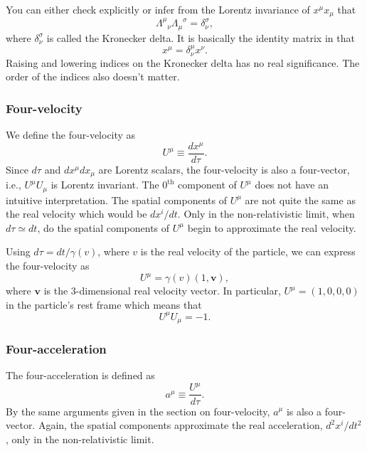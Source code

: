 \documentclass{article}
\begin{document}
You can either check explicitly or infer from the Lorentz invariance of $x^\mu x_\mu$ that \begin{equation} \Lambda^\mu_{\,\,\,\, \nu} \Lambda_\mu^{\,\,\,\, \sigma} = \delta^\sigma_\nu , \end{equation} where $\delta^\sigma_\nu$ is called the Kronecker delta. It is basically the identity matrix in that \begin{equation} x^\mu = \delta^\mu_\nu x^\nu . \end{equation} Raising and lowering indices on the Kronecker delta has no real significance. The order of the indices also doesn't matter.

\subsubsection*{Four-velocity}

We define the four-velocity as \begin{equation} U^\mu \equiv \frac{dx^\mu}{d \tau} . \end{equation} Since $d \tau$ and $dx^\mu dx_\mu$ are Lorentz scalars, the four-velocity is also a four-vector, i.e., $U^\mu U_\mu$ is Lorentz invariant. The $0^\mathrm{th}$ component of $U^\mu$ does not have an intuitive interpretation. The spatial components of $U^\mu$ are not quite the same as the real velocity which would be $dx^i/dt$. Only in the non-relativistic limit, when $d \tau \simeq dt$, do the spatial components of $U^\mu$ begin to approximate the real velocity.

Using $d \tau = dt / \gamma(v)$, where $v$ is the real velocity of the particle, we can express the four-velocity as \begin{equation} U^\mu = \gamma(v) (1,\mathbf{v}) , \end{equation} where $\mathbf{v}$ is the 3-dimensional real velocity vector. In particular, $U^\mu = (1,0,0,0)$ in the particle's rest frame which means that \begin{equation} U^\mu U_\mu = -1 . \end{equation}

\subsubsection*{Four-acceleration}

The four-acceleration is defined as \begin{equation} a^\mu \equiv \frac{U^\mu}{d \tau} . \end{equation} By the same arguments given in the section on four-velocity, $a^\mu$ is also a four-vector. Again, the spatial components approximate the real acceleration, $d^2 x^i / dt^2$, only in the non-relativistic limit.
\end{document}
